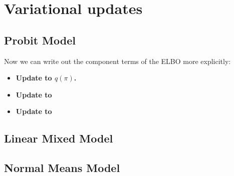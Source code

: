 \documentclass{article}
\begin{document}
\section{Variational updates}
\label{vi}
\subsection{Probit Model}
\label{probit_append}


 Now we can write out the component terms of the ELBO more explicitly:


\begin{itemize}
\item {\bf Update to $q(\pi)$.} 
\item {\bf Update to } 
\item {\bf Update to }
\end{itemize}


\subsection{Linear Mixed Model}
\label{lmm}


\subsection{Normal Means Model}
\label{normal}
\end{document}
